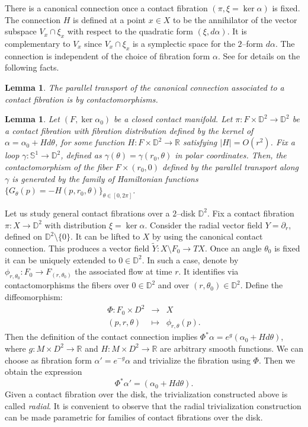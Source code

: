\documentclass[10pt]{amsart}
\newtheorem{lemma}[proposition]{Lemma}
\begin{document}
\noindent There is a canonical connection once a contact fibration $(\pi,\xi=\ker \alpha)$ is fixed. The connection $H$ is defined at a point $x\in X$ to be the annihilator of the vector subspace $V_x \cap \xi_x$ with respect to the quadratic form $(\xi, d\alpha)$. It is complementary to $V_x$ since $V_x \cap \xi_x$ is a symplectic space for the $2$--form $d\alpha$.  The connection is independent of the choice of fibration form $\alpha$. See \cite{Pr} for details on the following facts.
\begin{lemma}
The parallel transport of the canonical connection associated to a contact fibration is by contactomorphisms.
\end{lemma}
\begin{lemma} \label{lem:parallel}
Let $(F, \ker \alpha_0)$ be a closed contact manifold. Let $\pi: F\times{\mathbb{D}}^2 \longrightarrow {\mathbb{D}}^2$ be a contact fibration with fibration distribution defined by the kernel of $\alpha=\alpha_0 + Hd\theta$, for some function $H:F\times{\mathbb{D}}^2 \longrightarrow {\mathbb{R}}$ satisfying $|H|=O(r^2)$. Fix a loop $\gamma:{\mathbb{S}}^1 \longrightarrow{\mathbb{D}}^2$, defined as $\gamma(\theta)=\gamma(r_0, \theta)$ in polar coordinates. Then, the contactomorphism of the fiber $F \times (r_0, 0)$ defined by the parallel transport along $\gamma$ is generated by the family of Hamiltonian functions $\{G_{\theta}(p)=- H(p,r_0, \theta) \}_{\theta \in [0, 2\pi]}$.
\end{lemma}
\noindent Let us study general contact fibrations over a $2$--disk ${\mathbb{D}}^2$. Fix a contact fibration $\pi:X \longrightarrow{\mathbb{D}}^2$ with distribution $\xi=\ker\alpha$. Consider the radial vector field $Y= \partial_r$, defined on ${\mathbb{D}}^2 \setminus \{0\}$. It can be lifted to $X$ by using the canonical contact connection. This produces a vector field $\widetilde{Y}:X\setminus F_0\longrightarrow TX$. Once an angle $\theta_0$ is fixed it can be uniquely extended to $0\in{\mathbb{D}}^2$. In such a case, denote by $\phi_{r,\theta_0}: F_0 \longrightarrow F_{(r, \theta_0)}$ the associated flow at time $r$. It identifies via contactomorphisms the fibers over $0\in{\mathbb{D}}^2$ and over $(r,\theta_0)\in{\mathbb{D}}^2$. Define the diffeomorphism:
\begin{eqnarray*}
\Phi: F_0 \times D^2 & \longrightarrow & X \\
(p,r, \theta) & \longmapsto & \phi_{r, \theta} (p).
\end{eqnarray*}
Then the definition of the contact connection implies $\Phi^* \alpha = e^g(\alpha_0 +H d\theta)$, where $g:M \times D^2 \longrightarrow {\mathbb{R}}$ and $H: M \times D^2 \longrightarrow {\mathbb{R}}$ are arbitrary smooth functions. We can choose as fibration form $\alpha'= e^{-g} \alpha$ and trivialize the fibration using $\Phi$. Then we obtain the expression
\begin{equation}
\Phi^* \alpha' = (\alpha_0 +H d\theta). \label{eq:radial_triv}
\end{equation}
Given a contact fibration over the disk, the trivialization constructed above is called {\it radial}. It is convenient to observe that the radial trivialization construction can be made parametric for families of contact fibrations over the disk.
\end{document}
